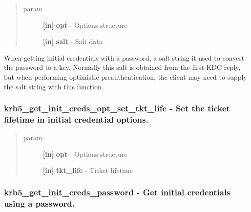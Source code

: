 \documentclass[letterpaper,10pt,english]{sphinxmanual}
\begin{document}
\begin{quote}\begin{description}
\item[{param}] \leavevmode
\textbf{{[}in{]}} \textbf{opt} - Options structure

\textbf{{[}in{]}} \textbf{salt} - Salt data

\end{description}\end{quote}

When getting initial credentials with a password, a salt string it used to convert the password to a key. Normally this salt is obtained from the first KDC reply, but when performing optimistic preauthentication, the client may need to supply the salt string with this function.


\subsubsection{krb5\_get\_init\_creds\_opt\_set\_tkt\_life -  Set the ticket lifetime in initial credential options.}
\label{appdev/refs/api/krb5_get_init_creds_opt_set_tkt_life:krb5-get-init-creds-opt-set-tkt-life-set-the-ticket-lifetime-in-initial-credential-options}\label{appdev/refs/api/krb5_get_init_creds_opt_set_tkt_life::doc}

\begin{fulllineitems}
\label{appdev/refs/api/krb5_get_init_creds_opt_set_tkt_life:krb5_get_init_creds_opt_set_tkt_life}
\end{fulllineitems}

\begin{quote}\begin{description}
\item[{param}] \leavevmode
\textbf{{[}in{]}} \textbf{opt} - Options structure

\textbf{{[}in{]}} \textbf{tkt\_life} - Ticket lifetime

\end{description}\end{quote}


\subsubsection{krb5\_get\_init\_creds\_password -  Get initial credentials using a password.}
\label{appdev/refs/api/krb5_get_init_creds_password::doc}\label{appdev/refs/api/krb5_get_init_creds_password:krb5-get-init-creds-password-get-initial-credentials-using-a-password}
\end{document}
